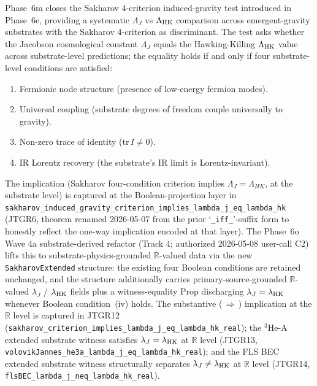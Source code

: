 \documentclass[aps,prd,reprint,nofootinbib,superscriptaddress]{revtex4-2}
\begin{document}
Phase~6m closes the Sakharov 4-criterion induced-gravity test introduced
in Phase~6e, providing a systematic $\Lambda_J$ vs $\Lambda_{\rm HK}$
comparison across emergent-gravity substrates with the Sakharov
4-criterion as discriminant. The test asks
whether the Jacobson cosmological constant $\Lambda_J$ equals the
Hawking-Killing $\Lambda_{\rm HK}$ value across substrate-level
predictions; the equality holds if and only if four substrate-level
conditions are satisfied:
\begin{enumerate}
\item Fermionic node structure (presence of low-energy fermion modes).
\item Universal coupling (substrate degrees of freedom couple universally
  to gravity).
\item Non-zero trace of identity ($\text{tr}\, I \neq 0$).
\item IR Lorentz recovery (the substrate's IR limit is Lorentz-invariant).
\end{enumerate}
The implication (Sakharov four-condition criterion implies
$\Lambda_J = \Lambda_{HK}$, at the substrate level) is captured at the
Boolean-projection layer in
\texttt{sakharov\_induced\_gravity\_criterion\_implies\_lambda\_j\_eq\_lambda\_hk}
(JTGR6, theorem renamed 2026-05-07 from the prior `\texttt{\_iff\_}'-suffix
form to honestly reflect the one-way implication encoded at that layer).
The Phase~6o Wave 4a substrate-derived refactor (Track 4; authorized
2026-05-08 user-call C2) lifts this to substrate-physics-grounded
$\mathbb{R}$-valued data via the new
\texttt{SakharovExtended} structure: the existing four Boolean
conditions are retained unchanged, and the structure additionally
carries primary-source-grounded $\mathbb{R}$-valued $\lambda_J$ /
$\lambda_{\rm HK}$ fields plus a witness-equality Prop discharging
$\lambda_J = \lambda_{\rm HK}$ whenever Boolean condition~(iv) holds.
The substantive (\,$\Rightarrow$\,) implication at the $\mathbb{R}$
level is captured in JTGR12
(\texttt{sakharov\_criterion\_implies\_lambda\_j\_eq\_lambda\_hk\_real});
the ${}^3\!\text{He-A}$ extended substrate witness satisfies
$\lambda_J = \lambda_{\rm HK}$ at $\mathbb{R}$ level (JTGR13,
\texttt{volovikJannes\_he3a\_lambda\_j\_eq\_lambda\_hk\_real}); and the
FLS BEC extended substrate witness structurally separates
$\lambda_J \neq \lambda_{\rm HK}$ at $\mathbb{R}$ level (JTGR14,
\texttt{flsBEC\_lambda\_j\_neq\_lambda\_hk\_real}).
\end{document}
